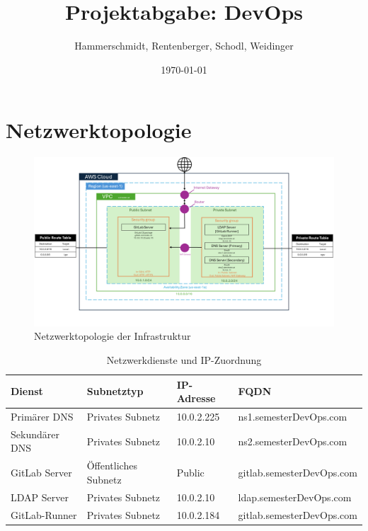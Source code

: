 \documentclass[a4paper,12pt]{article}
\title{Projektabgabe: DevOps}
\author{Hammerschmidt, Rentenberger, Schodl, Weidinger}
\date{\today}
\begin{document}
\maketitle
\tableofcontents
\newpage

\section{Netzwerktopologie}

\begin{figure}[h!]
	\centering
	\includegraphics[width=\textwidth]{data/DevOps_Network_Topology.png}
	\caption{Netzwerktopologie der Infrastruktur}
	\label{fig:network_topology}
\end{figure}

\begin{table}[h!]
	\centering
	\begin{tabular}{|l|l|l|l|}
		\hline
		\textbf{Dienst} & \textbf{Subnetztyp}  & \textbf{IP-Adresse} & \textbf{FQDN}      \\ \hline
		Primärer DNS    & Privates Subnetz     & 10.0.2.225          & ns1.semesterDevOps.com   \\ \hline
		Sekundärer DNS  & Privates Subnetz     & 10.0.2.10           & ns2.semesterDevOps.com   \\ \hline
		GitLab Server   & Öffentliches Subnetz & Public              & gitlab.semesterDevOps.com \\ \hline
		LDAP Server     & Privates Subnetz     & 10.0.2.10           & ldap.semesterDevOps.com   \\ \hline
		GitLab-Runner	& Privates Subnetz	   & 10.0.2.184			 & gitlab.semesterDevOps.com \\ \hline
	\end{tabular}
	\caption{Netzwerkdienste und IP-Zuordnung}
\end{table}
\end{document}
